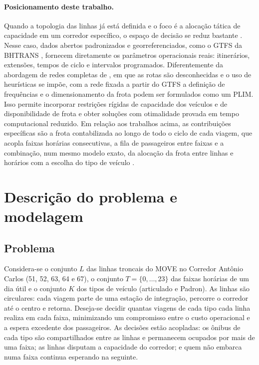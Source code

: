 \documentclass[11pt,a4paper]{article}
\begin{document}
\paragraph{Posicionamento deste trabalho.}
Quando a topologia das linhas já está definida e o foco é a alocação tática de
capacidade em um corredor específico, o espaço de decisão se reduz bastante
\citep{schmidt2024}. Nesse caso, dados abertos padronizados e
georreferenciados, como o GTFS da BHTRANS \citep{gtfsbhtrans}, fornecem
diretamente os parâmetros operacionais reais: itinerários, extensões, tempos de
ciclo e intervalos programados. Diferentemente da abordagem de redes completas
de \citet{arbex2015}, em que as rotas são desconhecidas e o uso de heurísticas
se impõe, com a rede fixada a partir do GTFS a definição de frequências e o
dimensionamento da frota podem ser formulados como um PLIM. Isso permite
incorporar restrições rígidas de capacidade dos veículos e de disponibilidade de
frota e obter soluções com otimalidade provada em tempo computacional reduzido.
Em relação aos trabalhos acima, as contribuições específicas são a frota
contabilizada ao longo de todo o ciclo de cada viagem, que acopla faixas
horárias consecutivas, a fila de passageiros entre faixas e a combinação, num
mesmo modelo exato, da alocação da frota entre linhas e horários
\citep{furth1981} com a escolha do tipo de veículo \citep{dellolio2012}.

\section{Descrição do problema e modelagem}\label{sec:modelo}

\subsection{Problema}

Considera-se o conjunto $L$ das linhas troncais do MOVE no Corredor Antônio
Carlos (51, 52, 63, 64 e 67), o conjunto $T=\{0,\dots,23\}$ das faixas horárias
de um dia útil e o conjunto $K$ dos tipos de veículo (articulado e Padron). As
linhas são circulares: cada viagem parte de uma estação de integração, percorre
o corredor até o centro e retorna. Deseja-se decidir quantas viagens de cada
tipo cada linha realiza em cada faixa, minimizando um compromisso entre o custo
operacional e a espera excedente dos passageiros. As decisões estão acopladas:
os ônibus de cada tipo são compartilhados entre as linhas e permanecem ocupados
por mais de uma faixa; as linhas disputam a capacidade do corredor; e quem não
embarca numa faixa continua esperando na seguinte.
\end{document}
